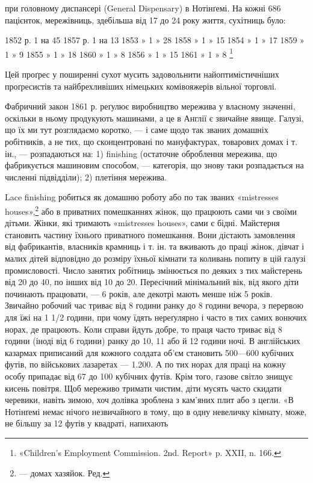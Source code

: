 \parcont{}  %
при головному диспансері (General Dispensary) в Нотінґемі. На
кожні 686 пацієнток, мережівниць, здебільша від 17 до 24 року
життя, сухітниць було:

1852 р.   1    на    45    1857 р.   1   на 13
1853  »   1     »      28    1858   »  1   »    15
1854  »   1     »      17    1859   »  1   »      9
1855  »   1     »      18    1860   »  1   »      8
1856  »   1     »      15    1861   »  1   »      8 \footnote{
«Children’s Employment Commission. 2nd. Report» p. XXII, n. 166.
}

Цей проґрес у поширенні сухот мусить задовольнити найоптимістичніших
проґресистів та найбрехливіших німецьких комівояжерів
вільної торговлі.

Фабричний закон 1861 р. реґулює виробництво мережива
у власному значенні, оскільки в ньому продукують машинами,
а це в Англії є звичайне явище. Галузі, що їх ми тут розглядаємо
коротко, — і саме щодо так званих домашніх робітників, а не
тих, що сконцентровані по мануфактурах, товарових домах і
т. ін., — розпадаються на: 1) finishing (остаточне оброблення
мережива, що фабрикується машиновим способом, — категорія,
що знову таки розпадається на численні підвідділи); 2) плетіння
мережива.

Lace finishing робиться як домашню роботу або по так званих
«mistresses houses»,\footnote*{
— домах хазяйок. Ред.
} або в приватних помешканнях жінок, що
працюють сами чи з своїми дітьми. Жінки, які тримають «mistresses
houses», сами є бідні. Майстерня становить частину їхнього
приватного помешкання. Вони дістають замовлення від фабрикантів,
власників крамниць і т. ін. та вживають до праці жінок,
дівчат і малих дітей відповідно до розміру їхньої кімнати та коливань
попиту в цій галузі промисловості. Число занятих робітниць
змінюється по деяких з тих майстерень від 20 до 40, по інших від
10 до 20. Пересічний мінімальний вік, від якого діти починають
працювати, — 6 років, але декотрі мають менше ніж 5 років. Звичайно
робочий час триває від 8 години ранку до 8 години вечора,
з перервою для їжі на 1 1/2 години, при чому їдять нереґулярно
і часто в тих самих вонючих норах, де працюють. Коли справи
йдуть добре, то праця часто триває від 8 години (іноді від 6 години)
ранку до 10, 11 або й 12 години ночі. В англійських казармах
приписаний для кожного солдата об’єм становить 500—600 кубічних
футів, по військових лазаретах — 1.200. А по тих норах
для праці на кожну особу припадає від 67 до 100 кубічних
футів. Крім того, газове світло знищує кисень повітря. Щоб
мереживо тримати чистим, діти мусять часто скидати черевики,
навіть зимою, хоч долівка зроблена з кам’яних плит або з цегли.
«В Нотінґемі немає нічого незвичайного в тому, що в одну невеличку
кімнату, може, не більшу за 12 футів у квадраті, напихають
\parbreak{}  %
